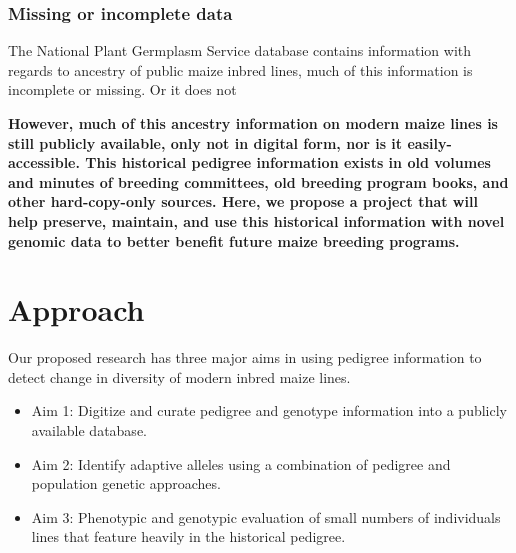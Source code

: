 \documentclass[12pt]{article}
\begin{document}
\subsubsection*{Missing or incomplete data}
\par The National Plant Germplasm Service database contains information with regards to ancestry of public maize inbred lines, much of this information is incomplete or missing. Or it does not 

\textbf{However, much of this ancestry information on modern maize lines  is still publicly available, only not in digital form, nor is it easily-accessible. This historical pedigree information exists in old volumes and minutes of breeding committees, old breeding program books, and other hard-copy-only sources. Here, we propose a project that will help preserve, maintain, and use this historical information with novel genomic data to better benefit future maize breeding programs.} 

\section*{Approach}
\label{sec:approach}
Our proposed research has three major aims in using pedigree information to detect change in diversity of modern inbred maize lines.




\begin{itemize}
\item Aim 1: Digitize and curate pedigree and genotype information into a publicly available database. 
\item Aim 2: Identify adaptive alleles using a combination of pedigree and population genetic approaches.
\item Aim 3: Phenotypic and genotypic evaluation of small numbers of individuals lines that feature heavily in the historical pedigree.

\end{itemize}
\end{document}
